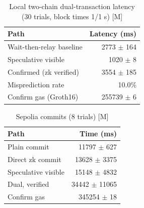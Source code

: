 \begin{table}[t]
\centering
\caption{Local two-chain dual-transaction latency (30 trials, block times 1/1 s) [M]}
\label{tab:dual}
\begin{tabular}{lr}
\toprule
Path & Latency (ms) \\
\midrule
Wait-then-relay baseline & 2773 $\pm$ 164 \\
Speculative visible & 1020 $\pm$ 8 \\
Confirmed (zk verified) & 3554 $\pm$ 185 \\
Misprediction rate & 10.0\% \\
Confirm gas (Groth16) & 255739 $\pm$ 6 \\
\bottomrule
\end{tabular}
\end{table}

\begin{table}[t]
\centering
\caption{Sepolia commits (8 trials) [M]}
\label{tab:sep}
\begin{tabular}{lr}
\toprule
Path & Time (ms) \\
\midrule
Plain commit & 11797 $\pm$ 627 \\
Direct zk commit & 13628 $\pm$ 3375 \\
Speculative visible & 15148 $\pm$ 4832 \\
Dual, verified & 34442 $\pm$ 11065 \\
Confirm gas & 345254 $\pm$ 18 \\
\bottomrule
\end{tabular}
\end{table}

